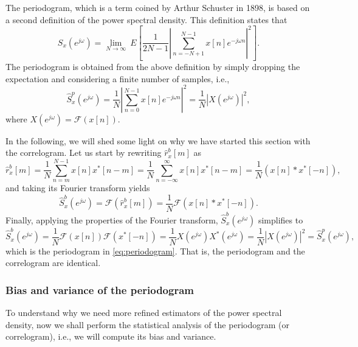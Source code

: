 The periodogram, which is a term coined by Arthur Schuster in 1898, is based on a second definition of the power spectral density. This definition states that
\begin{equation}
	S_x(e^{j \omega}) = \lim_{N \rightarrow \infty} \ E \left[\frac{1}{2N -1} \left| \sum_{n = -N+1}^{N-1} x[n] e^{-j \omega n} \right|^2 \right].
\end{equation}
The periodogram is obtained from the above definition by simply dropping the expectation and considering a finite number of samples, i.e.,
\begin{equation}
	\label{eq:periodogram}
	\hat{S}_x^{p}(e^{j \omega}) = \frac{1}{N} \left| \sum_{n = 0}^{N-1} x[n] e^{-j \omega n} \right|^2 = \frac{1}{N} \left| X(e^{j \omega}) \right|^2,
\end{equation}
where $X(e^{j \omega})  = \mathcal{F}(x[n])$.

In the following, we will shed some light on why we have started this section with the correlogram. Let us start by rewriting $\hat{r}_{x}^{b}[m]$ as
\begin{equation}
\hat{r}_{x}^{b}[m] = \frac{1}{N} \sum_{n = m}^{N-1} x[n] x^{\ast}[n-m] = \frac{1}{N} \sum_{n = -\infty}^{\infty} x[n] x^{\ast}[n-m]  = \frac{1}{N} \left(x[n] \ast x^{\ast}[-n]\right),
\end{equation}
and taking its Fourier transform yields
\begin{equation}
\hat{S}_x^{b}(e^{j \omega}) = \mathcal{F}(\hat{r}_{x}^{b}[m]) = \frac{1}{N} \mathcal{F} \left(x[n] \ast x^{\ast}[-n]\right).
\end{equation}
Finally, applying the properties of the Fourier transform, $\hat{S}_x^{b}(e^{j \omega})$ simplifies to
\begin{equation}
\hat{S}_x^{b}(e^{j \omega}) = \frac{1}{N} \mathcal{F} \left(x[n] \right) \mathcal{F} \left(x^{\ast}[-n]\right) = \frac{1}{N} X(e^{j \omega}) X^{\ast}(e^{j \omega}) = \frac{1}{N} \left| X(e^{j \omega}) \right|^2 = \hat{S}_x^{p}(e^{j \omega}),
\end{equation}
which is the periodogram in \eqref{eq:periodogram}. That is, the periodogram and the correlogram are identical.

\subsubsection{Bias and variance of the periodogram}

To understand why we need more refined estimators of the power spectral density, now we shall perform the statistical analysis of the periodogram (or correlogram), i.e.,  we will compute its bias and variance.

